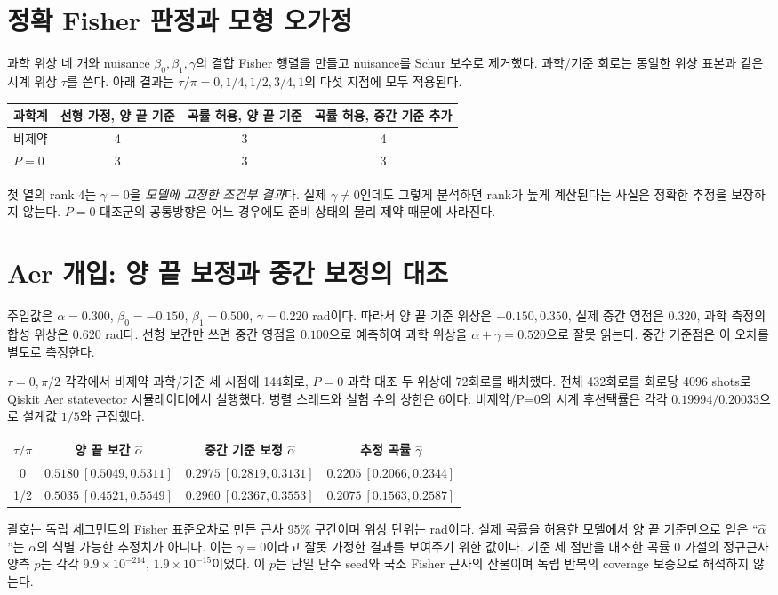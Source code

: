 \documentclass[11pt,a4paper]{article}
\begin{document}
\section{정확 Fisher 판정과 모형 오가정}
과학 위상 네 개와 nuisance $\beta_0,\beta_1,\gamma$의 결합 Fisher
행렬을 만들고 nuisance를 Schur 보수로 제거했다. 과학/기준 회로는
동일한 위상 표본과 같은 시계 위상 $\tau$를 쓴다. 아래 결과는
$\tau/\pi=0,1/4,1/2,3/4,1$의 다섯 지점에 모두 적용된다.
\begin{center}
\begin{tabular}{@{}lccc@{}}
\toprule
과학계 & 선형 가정, 양 끝 기준 & 곡률 허용, 양 끝 기준
& 곡률 허용, 중간 기준 추가 \\
\midrule
비제약 & 4 & 3 & 4 \\
$P=0$ & 3 & 3 & 3 \\
\bottomrule
\end{tabular}
\end{center}
첫 열의 rank 4는 $\gamma=0$을 \emph{모델에 고정한 조건부 결과}다.
실제 $\gamma\ne0$인데도 그렇게 분석하면 rank가 높게 계산된다는
사실은 정확한 추정을 보장하지 않는다. $P=0$ 대조군의 공통방향은
어느 경우에도 준비 상태의 물리 제약 때문에 사라진다.

\section{Aer 개입: 양 끝 보정과 중간 보정의 대조}
주입값은 $\alpha=0.300$, $\beta_0=-0.150$, $\beta_1=0.500$,
$\gamma=0.220$ rad이다. 따라서 양 끝 기준 위상은 $-0.150,0.350$,
실제 중간 영점은 $0.320$, 과학 측정의 합성 위상은 $0.620$ rad다.
선형 보간만 쓰면 중간 영점을 $0.100$으로 예측하여 과학 위상을
$\alpha+\gamma=0.520$으로 잘못 읽는다. 중간 기준점은 이 오차를
별도로 측정한다.

$\tau=0,\pi/2$ 각각에서 비제약 과학/기준 세 시점에 144회로,
$P=0$ 과학 대조 두 위상에 72회로를 배치했다. 전체 432회로를
회로당 4096 shots로 Qiskit Aer statevector 시뮬레이터에서 실행했다.
병렬 스레드와 실험 수의 상한은 6이다. 비제약/P=0의 시계 후선택률은
각각 $0.19994/0.20033$으로 설계값 $1/5$와 근접했다.
\begin{center}
\begin{tabular}{@{}cccc@{}}
\toprule
$\tau/\pi$ & 양 끝 보간 $\hat\alpha$ & 중간 기준 보정 $\hat\alpha$
& 추정 곡률 $\hat\gamma$ \\
\midrule
0 & $0.5180\ [0.5049,0.5311]$ & $0.2975\ [0.2819,0.3131]$
& $0.2205\ [0.2066,0.2344]$ \\
1/2 & $0.5035\ [0.4521,0.5549]$ & $0.2960\ [0.2367,0.3553]$
& $0.2075\ [0.1563,0.2587]$ \\
\bottomrule
\end{tabular}
\end{center}
괄호는 독립 세그먼트의 Fisher 표준오차로 만든 근사 95\% 구간이며
위상 단위는 rad이다. 실제 곡률을 허용한 모델에서 양 끝 기준만으로
얻은 ``$\hat\alpha$''는 $\alpha$의 식별 가능한 추정치가 아니다.
이는 $\gamma=0$이라고 잘못 가정한 결과를 보여주기 위한 값이다.
기준 세 점만을 대조한 곡률 0 가설의 정규근사 양측 $p$는 각각
$9.9\times10^{-214}$, $1.9\times10^{-15}$이었다. 이 $p$는
단일 난수 seed와 국소 Fisher 근사의 산물이며 독립 반복의 coverage
보증으로 해석하지 않는다.
\end{document}
